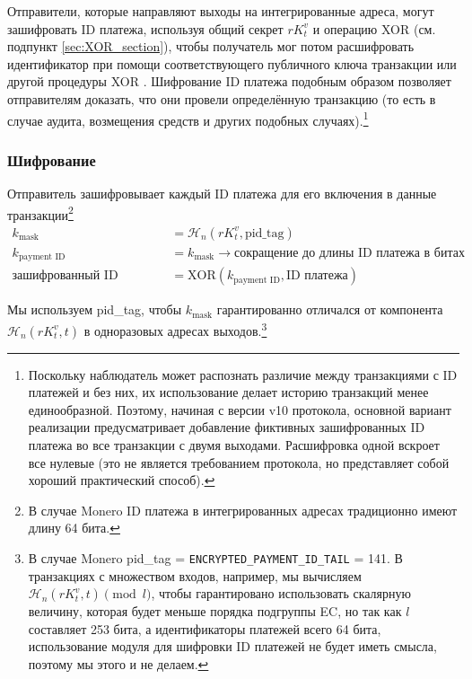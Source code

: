 Отправители, которые направляют выходы на интегрированные адреса, могут зашифровать ID платежа, используя общий секрет $r K_t^v$ и операцию XOR (см. подпункт \ref{sec:XOR_section}), чтобы получатель мог потом расшифровать идентификатор при помощи соответствующего публич\-ного ключа транзакции или другой процедуры XOR \cite{integrated-addresses}. Шифрование ID платежа подобным образом позволяет отправителям доказать, что они провели определённую транзакцию (то есть в случае аудита, возмещения средств и других подобных случаях).\footnote{Поскольку наблюдатель может распознать различие между транзакциями с ID платежей и без них, их использование делает историю транзакций менее единообразной. Поэтому, начиная с версии v10 протокола, основной вариант реализации предусматривает добавление фиктивных зашифрованных ID платежа во все транзакции с двумя выходами. Расшифровка одной вскроет все нулевые (это не является требованием протокола, но представляет собой хороший практический способ).}


\subsubsection*{Шифрование}

Отправитель зашифровывает каждый ID платежа для его включения в данные транзакции\footnote{В случае Monero ID платежа в интегрированных адресах традиционно имеют длину 64 бита.}\vspace{.175cm}
\begin{align*}
         k_{\textrm{mask}} &= \mathcal{H}_n(r K_t^v,\textrm{pid\_tag}) \\
      k_{\textrm{payment ID}} &= k_{\textrm{mask}} \rightarrow \textrm{сокращение до длины ID платежа в битах}\\
  \textrm{зашифрованный ID платежа} &= \textrm{XOR}(k_{\textrm{payment ID}}, \textrm{ID платежа})
\end{align*}

Мы используем pid\_tag, чтобы $k_{\textrm{mask}}$ гарантированно отличался от компонента $\mathcal{H}_n(r K_t^v, t)$ в одноразовых адресах выходов.\footnote{В случае Monero pid\_tag = {\tt ENCRYPTED\_PAYMENT\_ID\_TAIL} = 141. В транзакциях с множеством входов, например,  мы вычисляем $\mathcal{H}_n(r K_t^v, t) \pmod l$, чтобы гарантировано использовать скалярную величину, которая будет меньше порядка подгруппы EC, но так как $l$ составляет 253 бита, а идентификаторы платежей всего 64 бита, использование модуля для шифровки ID платежей не будет иметь смысла, поэтому мы этого и не делаем.}


